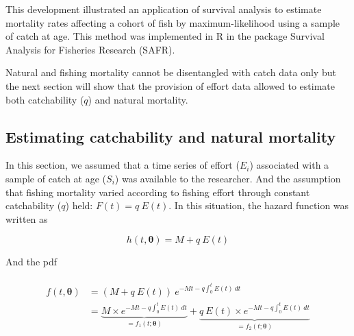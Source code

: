 \documentclass[12pt]{article}
\begin{document}


This development illustrated an application of survival analysis to estimate mortality rates affecting a cohort of fish by maximum-likelihood using a sample of catch at age. This method was implemented in R \citep{R} in the package Survival Analysis for Fisheries Research (SAFR).

Natural and fishing mortality cannot be disentangled with catch data only but the next section will show that the provision of effort data allowed to estimate both catchability ($q$) and natural mortality. 


\subsection{Estimating catchability and natural mortality}

In this section, we assumed that a time series of effort ($E_{i}$) associated with a sample of catch at age ($S_{i}$) was available to the researcher. And the assumption that fishing mortality varied according to fishing effort through constant catchability ($q$) held: $F(t) = q \ E(t)$. In this situation, the hazard function was written as

\begin{equation}
h(t,\bm{\theta}) = M + q \ E(t)
\end{equation} 

And the pdf

\begin{align}
\begin{split}
f(t, \bm{\theta}) &= ( M + q \ E(t)) \ e^{-Mt-q\int_{0}^{t}E(t) \ dt} \\
             &= \underbrace{M \times e^{-Mt-q\int_{0}^{t}E(t) \ dt}}_{=f_{1}(t; \bm{\theta})} + \underbrace{q \ E(t) \times e^{-Mt-q\int_{0}^{t}E(t) \ dt}}_{=f_{2}(t; \bm{\theta})}
\end{split}
\end{align}
\end{document}
